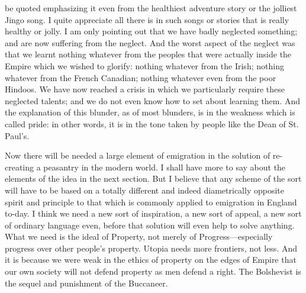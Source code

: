 \documentclass{book}
\begin{document}
be quoted emphasizing it even from the healthiest adventure story or the jolliest Jingo song. I quite appreciate all there is in such songs or stories that is really healthy or jolly. I am only pointing out that we have badly neglected something; and are now suffering from the neglect. And the worst aspect of the neglect was that we learnt nothing whatever from the peoples that were actually inside the Empire which we wished to glorify: nothing whatever from the Irish; nothing whatever from the French Canadian; nothing whatever even from the poor Hindoos. We have now reached a crisis in which we particularly require these neglected talents; and we do not even know how to set about learning them. And the explanation of this blunder, as of most blunders, is in the weakness which is called pride: in other words, it is in the tone taken by people like the Dean of St. Paul’s.

Now there will be needed a large element of emigration in the solution of re-creating a peasantry in the modern world. I shall have more to say about the elements of the idea in the next section. But I believe that any scheme of the sort will have to be based on a totally different and indeed diametrically opposite spirit and principle to that which is commonly applied to emigration in England to-day. I think we need a new sort of inspiration, a new sort of appeal, a new sort of ordinary language even, before that solution will even help to solve anything. What we need is the ideal of Property, not merely of Progress—especially progress over other people’s property. Utopia needs more frontiers, not less. And it is because we were weak in the ethics of property on the edges of Empire that our own society will not defend property as men defend a right. The Bolshevist is the sequel and punishment of the Buccaneer.
\end{document}
